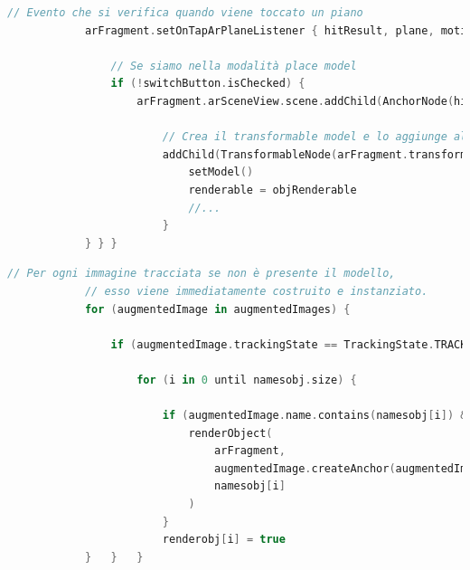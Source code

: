 \documentclass[crop=false, class=book]{standalone}
\begin{document}
	\begin{center}
	\begin{minipage}[c][\textheight][c]{\textwidth}
	\begin{center}
		\begin{minipage}{0.95\textwidth}
			\begin{lstlisting}[caption={Definizione Anchor in Plane Detection.}, label={lst: Definizione Anchor in Plane Detection}, language=Kotlin]
			// Evento che si verifica quando viene toccato un piano
			arFragment.setOnTapArPlaneListener { hitResult, plane, motionEvent ->
				
				// Se siamo nella modalità place model
				if (!switchButton.isChecked) {
					arFragment.arSceneView.scene.addChild(AnchorNode(hitResult.createAnchor()).apply {
					
						// Crea il transformable model e lo aggiunge all'anchor
						addChild(TransformableNode(arFragment.transformationSystem).apply {
							setModel()
							renderable = objRenderable
							//...
						}
			} }	}
			\end{lstlisting}
		\end{minipage}
	
	\vspace{3cm}
	
		\begin{minipage}{0.95\textwidth}
			\begin{lstlisting}[caption={Definizione Anchor in Augmented Images.}, label={lst: Definizione Anchor in Augmented Images}, language=Kotlin]
			// Per ogni immagine tracciata se non è presente il modello, 
			// esso viene immediatamente costruito e instanziato.
			for (augmentedImage in augmentedImages) {
				
				if (augmentedImage.trackingState == TrackingState.TRACKING) {
					
					for (i in 0 until namesobj.size) {
						
						if (augmentedImage.name.contains(namesobj[i]) && !renderobj[i]) {
							renderObject(
								arFragment,
								augmentedImage.createAnchor(augmentedImage.centerPose,
								namesobj[i]
							)
						}
						renderobj[i] = true
			}	}	}
			\end{lstlisting}
		\end{minipage}
	\end{center}
	\end{minipage}
	\end{center}
\end{document}

